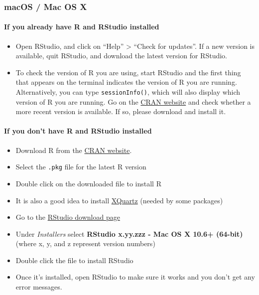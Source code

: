 \documentclass[
  12pt, krantz2,
]{krantz}
\newcommand{\passthrough}[1]{#1}
\providecommand{\tightlist}{%
  \setlength{\itemsep}{0pt}\setlength{\parskip}{0pt}}
\theoremstyle{definition}
\theoremstyle{definition}
\theoremstyle{definition}
\newcommand{\1}{\mathbbm{1}}
\begin{document}
\hypertarget{macos-mac-os-x}{%
\subsubsection{macOS / Mac OS X}\label{macos-mac-os-x}}

\hypertarget{if-you-already-have-r-and-rstudio-installed-1}{%
\paragraph{If you already have R and RStudio installed}\label{if-you-already-have-r-and-rstudio-installed-1}}

\begin{itemize}
\tightlist
\item
  Open RStudio, and click on ``Help'' \textgreater{} ``Check for updates''. If a new version is
  available, quit RStudio, and download the latest version for RStudio.
\item
  To check the version of R you are using, start RStudio and the first thing
  that appears on the terminal indicates the version of R you are running.
  Alternatively, you can type \passthrough{\lstinline!sessionInfo()!}, which will also display which
  version of R you are running. Go on the \href{https://cran.r-project.org/bin/macosx/}{CRAN
  website} and check whether a more
  recent version is available. If so, please download and install it.
\end{itemize}

\hypertarget{if-you-dont-have-r-and-rstudio-installed-1}{%
\paragraph{If you don't have R and RStudio installed}\label{if-you-dont-have-r-and-rstudio-installed-1}}

\begin{itemize}
\tightlist
\item
  Download R from
  the \href{http://cran.r-project.org/bin/macosx}{CRAN website}.
\item
  Select the \passthrough{\lstinline!.pkg!} file for the latest R version
\item
  Double click on the downloaded file to install R
\item
  It is also a good idea to install \href{https://www.xquartz.org/}{XQuartz} (needed
  by some packages)
\item
  Go to the \href{https://www.rstudio.com/products/rstudio/download/\#download}{RStudio download
  page}
\item
  Under \emph{Installers} select \textbf{RStudio x.yy.zzz - Mac OS X 10.6+ (64-bit)}
  (where x, y, and z represent version numbers)
\item
  Double click the file to install RStudio
\item
  Once it's installed, open RStudio to make sure it works and you don't get any
  error messages.
\end{itemize}
\end{document}
